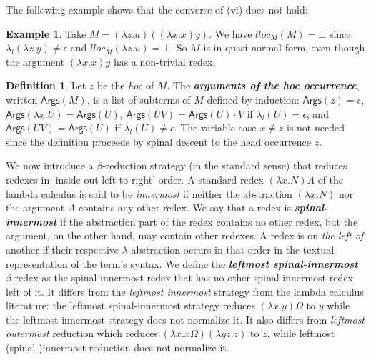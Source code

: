 \documentclass[xchauthor,chkrefs,GCNS,amsmath,amsthm,rotating,leaveRGB]{tcsg}
\renewcommand{\index}[1]{}
\theoremstyle{plain}
\theoremstyle{definition}
\newtheorem{definition}{Definition}[section]
\newtheorem{example}{Example}[section]
\begin{document}
The following example shows that the converse of (vi) does not hold:

\begin{example}
Take $M= (\lambda z.u)((\lambda x . x) y)$. We have $lloc_{M}(M) = \bot $
since $\lambda _{l}(\lambda z.y)\ne \epsilon $ and $lloc_{M}(\lambda z.u) =
\bot $. So $M$ is in quasi-normal form, even though the argument $(\lambda x
. x) y$ has a non-trivial redex.
\end{example}

\begin{definition}
Let $z$ be the \emph{hoc} of $M$. The \textbf{\emph{arguments of the \emph
{hoc} occurrence}}\index{arguments of the \emph {hoc} occurrence}, written
$\mathsf{Args}(M)$, is a list of subterms of $M$ defined by induction:
$\mathsf{Args}(z) = \epsilon $, $\mathsf{Args}(\lambda x . U ) =
\mathsf{Args}(U)$, $\mathsf{Args}(U V) = \mathsf{Args}(U) \cdot V$  if
$\lambda _{l}(U) = \epsilon $, and $\mathsf{Args}(U V) = \mathsf{Args}(U)$ if
$\lambda _{l}(U) \neq \epsilon $. The variable case $x\neq z$ is not needed
since the definition proceeds by spinal descent to the head occurrence $z$.
\end{definition}

We now introduce a $\beta $-reduction strategy (in the standard sense) that
reduces redexes in `inside-out left-to-right' order. A standard redex
$(\lambda x . N) A$ of the lambda calculus is said to be \emph{innermost} if
neither the abstraction $(\lambda x . N)$ nor the argument $A$  contains any
other redex. We say that a redex is
\textbf{\emph{spinal-innermost}}\index{spinal-innermost} if the abstraction
part of the redex contains no other redex, but the argument, on the other
hand, may contain other redexes. A redex is on \emph{the left of} another if
their respective $\lambda $-abstraction occurs in that order in the textual
representation of the term's syntax. We define the \textbf{\emph{leftmost
spinal-innermost}}\index{leftmost spinal-innermost} $\beta $-redex as the
spinal-innermost redex that has no other spinal-innermost redex left of it.
It differs from the \emph{leftmost innermost} strategy from the lambda
calculus literature: the leftmost spinal-innermost strategy reduces $(\lambda
x . y) \Omega $ to $y$ while the leftmost innermost strategy does not
normalize it. It also differs from \emph{leftmost outermost} reduction which
reduces $(\lambda x . x \Omega )(\lambda y z . z)$ to $z$, while leftmost
(spinal-)innermost reduction does not normalize it.
\end{document}
